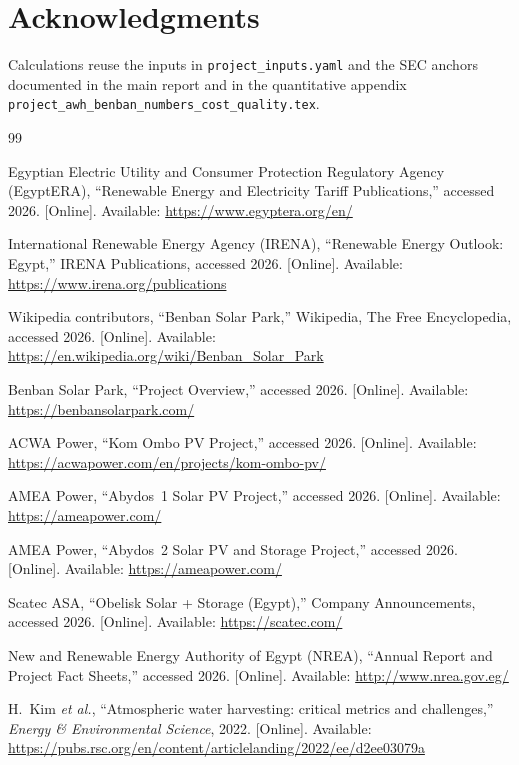 \documentclass[11pt,a4paper]{article}
\begin{document}
\section*{Acknowledgments}
Calculations reuse the inputs in \texttt{project\_inputs.yaml} and the SEC anchors documented in the main report and in the quantitative appendix \texttt{project\_awh\_benban\_numbers\_cost\_quality.tex}.

\begin{thebibliography}{99}

Egyptian Electric Utility and Consumer Protection Regulatory Agency (EgyptERA), ``Renewable Energy and Electricity Tariff Publications,'' accessed 2026. [Online]. Available: \url{https://www.egyptera.org/en/}

International Renewable Energy Agency (IRENA), ``Renewable Energy Outlook: Egypt,'' IRENA Publications, accessed 2026. [Online]. Available: \url{https://www.irena.org/publications}

Wikipedia contributors, ``Benban Solar Park,'' Wikipedia, The Free Encyclopedia, accessed 2026. [Online]. Available: \url{https://en.wikipedia.org/wiki/Benban_Solar_Park}

Benban Solar Park, ``Project Overview,'' accessed 2026. [Online]. Available: \url{https://benbansolarpark.com/}

ACWA Power, ``Kom Ombo PV Project,'' accessed 2026. [Online]. Available: \url{https://acwapower.com/en/projects/kom-ombo-pv/}

AMEA Power, ``Abydos~1 Solar PV Project,'' accessed 2026. [Online]. Available: \url{https://ameapower.com/}

AMEA Power, ``Abydos~2 Solar PV and Storage Project,'' accessed 2026. [Online]. Available: \url{https://ameapower.com/}

Scatec ASA, ``Obelisk Solar + Storage (Egypt),'' Company Announcements, accessed 2026. [Online]. Available: \url{https://scatec.com/}

New and Renewable Energy Authority of Egypt (NREA), ``Annual Report and Project Fact Sheets,'' accessed 2026. [Online]. Available: \url{http://www.nrea.gov.eg/}

H.~Kim \textit{et al.}, ``Atmospheric water harvesting: critical metrics and challenges,'' \textit{Energy \& Environmental Science}, 2022. [Online]. Available: \url{https://pubs.rsc.org/en/content/articlelanding/2022/ee/d2ee03079a}


\end{thebibliography}
\end{document}
